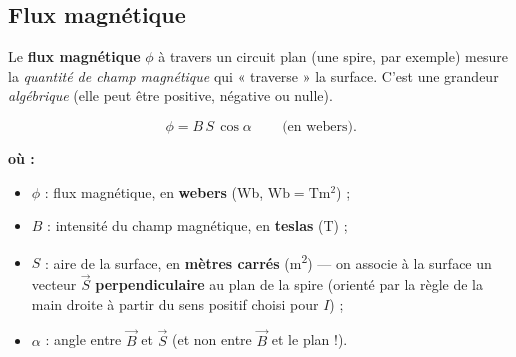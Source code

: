 \documentclass[11pt,a4paper]{article}
\newenvironment{ou}{%
  \par\smallskip\noindent\textbf{où :}\nopagebreak
  \begin{itemize}[leftmargin=1.8em,topsep=2pt,itemsep=1.5pt,parsep=0pt]}%
  {\end{itemize}}
\newcommand{\Bvec}{\vec{B}}
\newcommand{\Svec}{\vec{S}}
\begin{document}
\subsection{Flux magnétique}

\begin{definition}
Le \textbf{flux magnétique} $\phi$ à travers un circuit plan (une spire, par exemple) mesure la
\emph{quantité de champ magnétique} qui « traverse » la surface. C'est une grandeur \emph{algébrique}
(elle peut être positive, négative ou nulle).
\end{definition}

\begin{formule}
\[ \boxed{\,\phi = B\, S\, \cos\alpha\,} \qquad\text{(en webers).} \]
\begin{ou}
  \item $\phi$ : flux magnétique, en \textbf{webers} (\si{\weber}, $\si{\weber}=\si{\tesla\metre\squared}$) ;
  \item $B$ : intensité du champ magnétique, en \textbf{teslas} (\si{\tesla}) ;
  \item $S$ : aire de la surface, en \textbf{mètres carrés} (\si{\metre\squared}) — on associe à la
        surface un vecteur $\Svec$ \textbf{perpendiculaire} au plan de la spire (orienté par la règle
        de la main droite à partir du sens positif choisi pour $I$) ;
  \item $\alpha$ : angle entre $\Bvec$ et $\Svec$ (et non entre $\Bvec$ et le plan !).
\end{ou}
\end{formule}

\begin{center}
\end{center}
\end{document}
